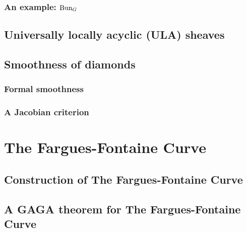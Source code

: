             \subsubsection{An example: \texorpdfstring{$\mathrm{Bun}_G$}{}}
            
        \subsection{Universally locally acyclic (ULA) sheaves}
        
        \subsection{Smoothness of diamonds}
            \subsubsection{Formal smoothness}
            
            \subsubsection{A Jacobian criterion}
            
    \section{The Fargues-Fontaine Curve}
        \subsection{Construction of The Fargues-Fontaine Curve}
        
        \subsection{A GAGA theorem for The Fargues-Fontaine Curve}